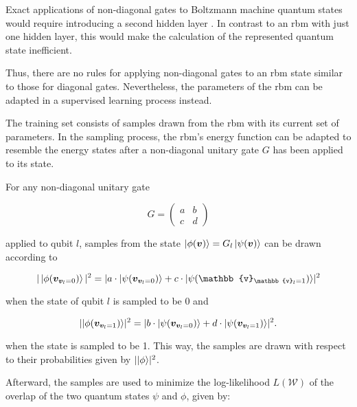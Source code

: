 Exact applications of non-diagonal gates to Boltzmann machine quantum states would require introducing a second hidden layer \cite{carleo2018constructing}. In contrast to an \gls{rbm} with just one hidden layer, this would make the calculation of the represented quantum state inefficient.

Thus, there are no rules for applying non-diagonal gates to an \gls{rbm} state similar to those for diagonal gates. Nevertheless, the parameters of the \gls{rbm} can be adapted in a 
supervised learning process instead.

The training set consists of samples drawn from the \gls{rbm} with its current set of parameters. In the sampling process, the \gls{rbm}'s energy function can be adapted to resemble the energy states after a non-diagonal unitary gate $ G $ has been applied to its state.

For any non-diagonal unitary gate

\begin{equation}
    G =  \begin{pmatrix}
        a & b \\
        c & d
    \end{pmatrix}
\end{equation}

applied to qubit $l$, samples from the state $\ket{\phi(\bm{v})} = G_l\ket{\psi(\bm{v})}$ can be drawn according to 

\begin{equation}
    \label{eq:prob1}
    | \ket{\phi(\bm{v}_{\bm{v}_l = 0})} |^2 = 
    \lvert  a \cdot \ket{\psi(\bm{v}_{\bm{v}_l = 0})} +
            c \cdot \ket{\psi(\mathbb{v}_{\mathbb{v}_l = 1})}
    \rvert^2
\end{equation}

when the state of qubit $l$ is sampled to be 0 and 

\begin{equation}
    \label{eq:prob2}
    \lvert \ket{\phi(\bm{v}_{\bm{v}_l = 1})} \rvert^2 = 
    \lvert  b \cdot \ket{\psi(\bm{v}_{\bm{v}_l = 0})} +
            d \cdot \ket{\psi(\bm{v}_{\bm{v}_l = 1})}
    \rvert^2.
\end{equation}

when the state is sampled to be 1. This way, the samples are drawn with respect to their 
probabilities given by $\lvert \Ket{\phi} \rvert^2$.

Afterward, the samples are used to minimize the log-likelihood $L(\mathcal{W})$ of the overlap of the two quantum 
states $\psi$ and $\phi$, given by:

